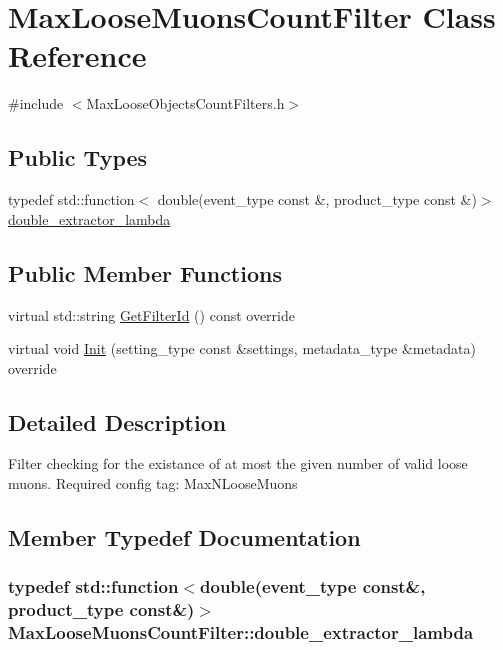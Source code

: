 \hypertarget{classMaxLooseMuonsCountFilter}{
\section{MaxLooseMuonsCountFilter Class Reference}
\label{classMaxLooseMuonsCountFilter}
}


{\ttfamily \#include $<$MaxLooseObjectsCountFilters.h$>$}\subsection*{Public Types}
\begin{DoxyCompactItemize}
\item 
typedef std::function$<$ double(event\_\-type const \&, product\_\-type const \&)$>$ \hyperlink{classMaxLooseMuonsCountFilter_afa57cf1998c0ea1958154102426bfe33}{double\_\-extractor\_\-lambda}
\end{DoxyCompactItemize}
\subsection*{Public Member Functions}
\begin{DoxyCompactItemize}
\item 
virtual std::string \hyperlink{classMaxLooseMuonsCountFilter_a9b8ffc6d02a83e06623ab8a16777a1db}{GetFilterId} () const override
\item 
virtual void \hyperlink{classMaxLooseMuonsCountFilter_ab7cee67d21f4e51ac1098f2ec372bfdf}{Init} (setting\_\-type const \&settings, metadata\_\-type \&metadata) override
\end{DoxyCompactItemize}


\subsection{Detailed Description}
Filter checking for the existance of at most the given number of valid loose muons. Required config tag: MaxNLooseMuons 

\subsection{Member Typedef Documentation}
\hypertarget{classMaxLooseMuonsCountFilter_afa57cf1998c0ea1958154102426bfe33}{
\subsubsection[{double\_\-extractor\_\-lambda}]{\setlength{\rightskip}{0pt plus 5cm}typedef std::function$<$double(event\_\-type const\&, product\_\-type const\&)$>$ {\bf MaxLooseMuonsCountFilter::double\_\-extractor\_\-lambda}}}
\label{classMaxLooseMuonsCountFilter_afa57cf1998c0ea1958154102426bfe33}


